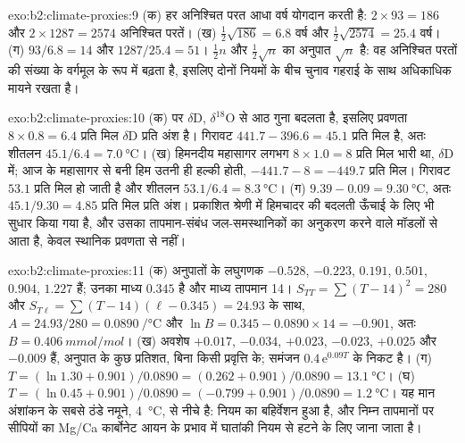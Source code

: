 \begin{solution}{exo:b2:climate-proxies:9}
(क) हर अनिश्चित परत आधा वर्ष योगदान करती है: $2 \times 93 = 186$ और $2 \times 1287 = 2574$
अनिश्चित परतें। (ख) $\frac12\sqrt{186} = 6.8$ वर्ष और $\frac12\sqrt{2574} = 25.4$ वर्ष।
(ग) $93/6.8 = 14$ और $1287/25.4 = 51$। $\frac12 n$ और $\frac12\sqrt{n}$ का अनुपात
$\sqrt{n}$ है: वह अनिश्चित परतों की संख्या के वर्गमूल के रूप में बढ़ता है, इसलिए दोनों नियमों के बीच
चुनाव गहराई के साथ अधिकाधिक मायने रखता है।
\end{solution}

\begin{solution}{exo:b2:climate-proxies:10}
(क)  पर $\delta$D, $\delta^{18}$O से आठ गुना बदलता है, इसलिए
प्रवणता $8 \times 0.8 = 6.4$ प्रति मिल $\delta$D प्रति अंश है। गिरावट $441.7 - 396.6 = 45.1$
प्रति मिल है, अतः शीतलन $45.1/6.4 = \qty{7.0}{\celsius}$। (ख) हिमनदीय महासागर लगभग
$8 \times 1.0 = 8$ प्रति मिल भारी था, $\delta$D में; आज के महासागर से बनी हिम
उतनी ही हल्की होती, $-441.7 - 8 = -449.7$ प्रति मिल। गिरावट $53.1$ प्रति मिल हो जाती है और शीतलन
$53.1/6.4 = \qty{8.3}{\celsius}$। (ग) $9.39 - 0.09 = \qty{9.30}{\celsius}$, अतः $45.1/9.30 = 4.85$
प्रति मिल प्रति अंश। प्रकाशित श्रेणी में हिमचादर की बदलती ऊँचाई के लिए भी सुधार किया गया है,
और उसका तापमान-संबंध जल-समस्थानिकों का अनुकरण करने वाले मॉडलों से आता है, केवल
स्थानिक प्रवणता से नहीं।
\end{solution}

\begin{solution}{exo:b2:climate-proxies:11}
(क) अनुपातों के लघुगणक $-0.528$, $-0.223$, $0.191$, $0.501$, $0.904$, $1.227$ हैं; उनका
माध्य $0.345$ है और माध्य तापमान 14। $S_{TT} = \sum (T - 14)^2 = 280$ और $S_{T\ell} =
\sum (T - 14)(\ell - 0.345) = 24.93$ के साथ, $A = 24.93/280 = \qty{0.0890}{\per\celsius}$ और $\ln B =
0.345 - 0.0890 \times 14 = -0.901$, अतः $B = \qty{0.406}{mmol/mol}$। (ख) अवशेष
$+0.017$, $-0.034$, $+0.023$, $-0.023$, $+0.025$ और $-0.009$ हैं, अनुपात के कुछ प्रतिशत, बिना किसी
प्रवृत्ति के; समंजन $0.4\,\mathrm{e}^{0.09T}$ के निकट है। (ग) $T = (\ln 1.30 + 0.901)/0.0890 = (0.262 +
0.901)/0.0890 = \qty{13.1}{\celsius}$। (घ) $T = (\ln 0.45 + 0.901)/0.0890 = (-0.799 +
0.901)/0.0890 = \qty{1.2}{\celsius}$। यह मान अंशांकन के सबसे ठंडे नमूने,
\qty{4}{\celsius}, से नीचे है: नियम का बहिर्वेशन हुआ है, और निम्न तापमानों पर सीपियों का Mg/Ca
कार्बोनेट आयन के प्रभाव में घातांकी नियम से हटने के लिए जाना जाता है।
\end{solution}

